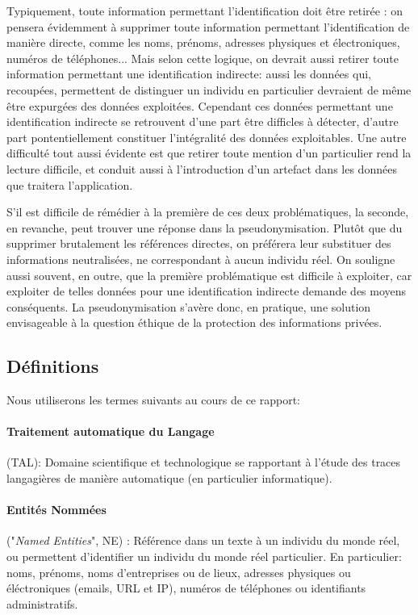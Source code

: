 \documentclass{article}
\begin{document}
Typiquement, toute information permettant l'identification doit être retirée : on pensera évidemment à supprimer toute information permettant l'identification de manière directe, comme les noms, prénoms, adresses physiques et électroniques, numéros de téléphones...
Mais selon cette logique, on devrait aussi retirer toute information permettant une identification indirecte: aussi les données qui, recoupées, permettent de distinguer un individu en particulier devraient de même être expurgées des données exploitées.
Cependant ces données permettant une identification indirecte se retrouvent d'une part être difficles à détecter, d'autre part pontentiellement constituer l'intégralité des données exploitables.
Une autre difficulté tout aussi évidente est que retirer toute mention d'un particulier rend la lecture difficile, et conduit aussi à l'introduction d'un artefact dans les données que traitera l'application.
\par
S'il est difficile de rémédier à la première de ces deux problématiques, la seconde, en revanche, peut trouver une réponse dans la pseudonymisation.
Plutôt que du supprimer brutalement les références directes, on préférera leur substituer des informations neutralisées, ne correspondant à aucun individu réel.
On souligne aussi souvent, en outre, que la première problématique est difficile à exploiter, car exploiter de telles données pour une identification indirecte demande des moyens conséquents.
La pseudonymisation s'avère donc, en pratique, une solution envisageable à la question éthique de la protection des informations privées.

\subsection{Définitions}
Nous utiliserons les termes suivants au cours de ce rapport:
\paragraph{Traitement automatique du Langage} (TAL): Domaine scientifique et technologique se rapportant à l'étude des traces langagières de manière automatique (en particulier informatique).
\paragraph{Entités Nommées} ("\textit{Named Entities}", NE) : Référence dans un texte à un individu du monde réel, ou permettent d'identifier un individu du monde réel particulier.
En particulier: noms, prénoms, noms d'entreprises ou de lieux, adresses physiques ou éléctroniques (emails, URL et IP), numéros de téléphones ou identifiants administratifs.
\end{document}
